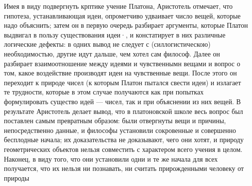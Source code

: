 \documentclass{article}
\begin{document}
Имея в виду подвергнуть крптике учение Платона, Аристотель отмечает, что гипотеза, устанавливающая идеи, опрометчиво удваивает число вещей, которые надо объяснить; затем он в первую очередь разбирает аргументы, которые Платон выдвигал в пользу существования идеи·, и констатирует в них различные логические дефекты: в одних вывод не следует с (силлогистическою) необходимостью, другие идут дальше, чем хотел сам философ. Далее он разбирает взаимоотношение между идеями и чувственнымн вещами и вопрос о том, какое воздействие производят идеи на чувственные вещи. После этого он переходит к природе чисел (к которым Платон пытался свести идеи) и излагает те трудности, которые в этом случае получаются как при попытках формулировать существо идей --- чисел, так и при объяснении из них вещей. В результате Аристотель делает вывод, что в платоновской школе весь вопрос был поставлен самым превратным образом: были отвергнуты вещи и причины, непосредственно данные, и философы установили сокровенные и совершенно бесплодные начала; их доказательства не доказывают, чего они хотят, и природу геометрических объектов нельзя совместить с характером всего учения в целом. Наконец, в виду того, что они установили одни и те же начала для всех получается, что их нельзя ни познавать, ни считать прирожденными человеку от природы
\end{document}
